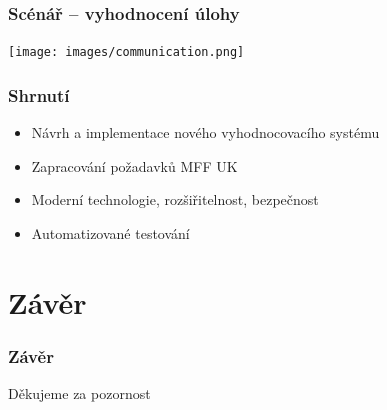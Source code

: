 \documentclass{beamer}
\begin{document}
\begin{frame}
	\frametitle{Scénář -- vyhodnocení úlohy}
	\begin{center}
		\texttt{[image: images/communication.png]}
	\end{center}
\end{frame}

\begin{frame}
	\frametitle{Shrnutí}
	\begin{itemize}
		\item Návrh a implementace nového vyhodnocovacího systému
		\item Zapracování požadavků MFF UK
		\item Moderní technologie, rozšiřitelnost, bezpečnost
		\item Automatizované testování
	\end{itemize}
\end{frame}

\section{Závěr}
\begin{frame}
	\frametitle{Závěr}
	\centering
	\LARGE{Děkujeme za pozornost}
\end{frame}
\end{document}
